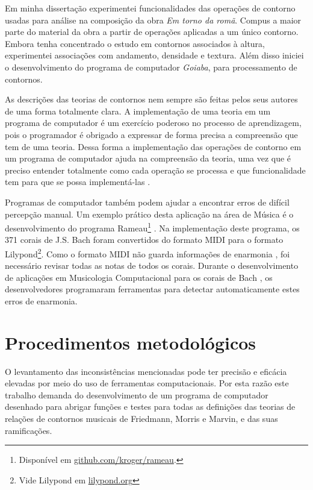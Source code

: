 \documentclass[12pt]{article}
\newcommand{\goiaba}[0]{\textit{Goiaba}}
\newcommand{\obra}[0]{\textit{Em torno da romã}}
\begin{document}

Em minha dissertação \cite{sampaio08:em} experimentei funcionalidades
das operações de contorno usadas para análise na composição da obra
\obra{}. Compus a maior parte do material da obra a partir de
operações aplicadas a um único contorno. Embora tenha concentrado o
estudo em contornos associados à altura, experimentei associações com
andamento, densidade e textura. Além disso iniciei o desenvolvimento
do programa de computador \goiaba{}, para processamento de contornos.

As descrições das teorias de contornos nem sempre são feitas pelos
seus autores de uma forma totalmente clara. A implementação de uma
teoria em um programa de computador é um exercício poderoso no
processo de aprendizagem, pois o programador é obrigado a expressar de
forma precisa a compreensão que tem de uma teoria. Dessa forma a
implementação das operações de contorno em um programa de computador
ajuda na compreensão da teoria, uma vez que é preciso entender
totalmente como cada operação se processa e que funcionalidade tem
para que se possa implementá-las \cite{sampaio08:em}.

Programas de computador também podem ajudar a encontrar erros de
difícil percepção manual. Um exemplo prático desta aplicação na área
de Música é o desenvolvimento do programa Rameau\footnote{Disponível
  em \url{github.com/kroger/rameau}.}
\cite{kroger08:rameau,passos.ea09:functional}. Na implementação deste
programa, os 371 corais de J.S. Bach foram convertidos do formato MIDI
para o formato Lilypond\footnote{Vide Lilypond em
  \url{lilypond.org}}. Como o formato MIDI não guarda informações de
enarmonia \cite{selfridge-field97:beyond}, foi necessário revisar
todas as notas de todos os corais. Durante o desenvolvimento de
aplicações em Musicologia Computacional para os corais de Bach
\cite{kroger08:musicologia}, os desenvolvedores programaram
ferramentas para detectar automaticamente estes erros de enarmonia.

\section{Procedimentos metodológicos}
\label{sec:metodologia}

O levantamento das inconsistências mencionadas pode ter precisão e
eficácia elevadas por meio do uso de ferramentas computacionais. Por
esta razão este trabalho demanda do desenvolvimento de um programa de
computador desenhado para abrigar funções e testes para todas as
definições das teorias de relações de contornos musicais de Friedmann,
Morris e Marvin, e das suas ramificações.
\end{document}
